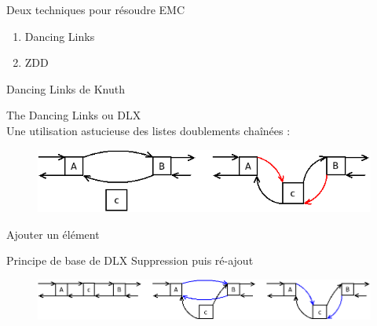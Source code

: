 \documentclass{beamer}
\begin{document}
 \begin{frame}{Deux techniques pour résoudre EMC}

\begin{enumerate}
\item Dancing Links
\item ZDD 
\end{enumerate}




\end{frame}
\begin{frame}{Dancing Links de Knuth}

The Dancing Links ou DLX\\
Une utilisation astucieuse des listes doublements chaînées : 
\begin{figure}[h]
\begin{center}
\includegraphics[scale=0.5]{../imports/add_elmt_dll.png}
\end{center}
\end{figure}
Ajouter un élément
\end{frame}

\begin{frame}{Principe de base de DLX}
Suppression puis ré-ajout
\begin{figure}[h]
\begin{center}
\includegraphics[scale=0.3]{../imports/delete.png}
\end{center}
\end{figure}
\end{frame}
\end{document}
